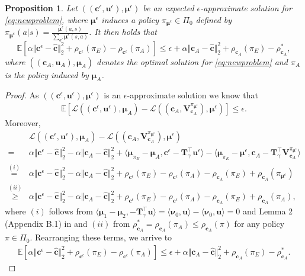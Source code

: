 \documentclass[10pt]{article} %
\newtheorem{proposition}{Proposition}
\def\mTg{{\bm{T}}_\gamma}
\def\vc{{\bm{c}}}
\def\vu{{\bm{u}}}
\def\vV{{\bm{V}}}
\def\vmu{{\bm{\mu}}}
\def\vnu{{\bm{\nu}}}
\newcommand{\E}{\mathbb{E}}
\begin{document}
\begin{proposition} \label{prop:epsilonapproxOptimality}
    Let $((\vc^\epsilon,\vu^\epsilon),\vmu^\epsilon)$ be an expected $\epsilon$-approximate solution for \eqref{eq:newproblem}, where $\vmu^\epsilon$ induces a policy $\pi_{\vmu^\epsilon}\in \Pi_0$ defined by $\pi_{\vmu^\epsilon}(a|s) = \frac{\vmu^\epsilon(a,s)}{\sum_{a'}\vmu^\epsilon(s,a)}$. It then holds that
    $$\E\left[\alpha\Vert \vc^\epsilon - \hat{\vc}\Vert^2_2 + \rho_{\vc^\epsilon}(\pi_E) -\rho_{\vc^\epsilon}(\pi_A) \right] \leq \epsilon +\alpha\Vert \vc_A - \hat{\vc}\Vert^2_2 + \rho_{\vc_A}(\pi_E) -\rho_{\vc_A}^*,$$
    where $((\vc_A,\vu_A), \vmu_A)$ denotes the optimal solution for \eqref{eq:newproblem} and $\pi_A$ is the policy induced by $\vmu_{A}$.
\end{proposition}
\begin{proof}
As $((\vc^\epsilon,\vu^\epsilon),\vmu^\epsilon)$ is an $\epsilon$-approximate solution we know that 
\begin{align*}
    \E\left[\mathcal{L}((\vc^\epsilon,\vu^\epsilon),\vmu_{A}) - \mathcal{L}((\vc_A,\vV^{\pi_{\vmu^\epsilon}}_{\vc_A}),\vmu^\epsilon) \right] \leq \epsilon.
\end{align*}
Moreover, 
\begin{align*}
    &\mathcal{L}((\vc^\epsilon,\vu^\epsilon),\vmu_{A}) - \mathcal{L}((\vc_A,\vV^{\pi_{\vmu^\epsilon}}_{\vc_A}),\vmu^\epsilon)\\
    = &\alpha\Vert \vc^\epsilon - \hat{\vc} \Vert_2^2 - \alpha\Vert \vc_A - \hat{\vc} \Vert_2^2+ \langle \vmu_{\pi_E} -\vmu_A, \vc^\epsilon - \mTg^\top \vu^\epsilon \rangle - \langle \vmu_{\pi_E} -\vmu^\epsilon, \vc_A - \mTg^\top \vV^{\pi_{\vmu^\epsilon}}_{\vc_A} \rangle\\
    \stackrel{(i)}{=}  &\alpha\Vert \vc^\epsilon - \hat{\vc} \Vert_2^2 - \alpha\Vert \vc_A - \hat{\vc} \Vert_2^2+ \rho_{\vc^\epsilon}(\pi_E) - \rho_{\vc^\epsilon}(\pi_A) - \rho_{\vc_A}(\pi_E) + \rho_{\vc_A}(\pi_{\vmu^\epsilon})\\
    \stackrel{(ii)}{\geq}  &\alpha\Vert \vc^\epsilon - \hat{\vc} \Vert_2^2 - \alpha\Vert \vc_A - \hat{\vc} \Vert_2^2+ \rho_{\vc^\epsilon}(\pi_E) - \rho_{\vc^\epsilon}(\pi_A) - \rho_{\vc_A}(\pi_E) + \rho_{\vc_A}(\pi_A),
\end{align*}
where $(i)$ follows from $\langle \vmu_{1} - \vmu_2, -\mTg^\top\vu\rangle = \langle \vnu_0, \vu\rangle - \langle \vnu_0, \vu\rangle = 0$ and Lemma 2 (Appendix B.1) in \cite{Kamoutsi2021} and 
$(ii)$ from $\rho_{\vc_A}^* = \rho_{\vc_A}(\pi_A) \leq \rho_{\vc_A}(\pi)$ for any policy $\pi\in\Pi_0$. Rearranging these terms, we arrive to
\begin{align*}
    \E\left[\alpha\Vert \vc^\epsilon - \hat{\vc}\Vert^2_2 + \rho_{\vc^\epsilon}(\pi_E) -\rho_{\vc^\epsilon}(\pi_A) \right] \leq \epsilon +\alpha\Vert \vc_A - \hat{\vc}\Vert^2_2 + \rho_{\vc_A}(\pi_E) -\rho_{\vc_A}^*.
\end{align*}
\end{proof}
\end{document}
